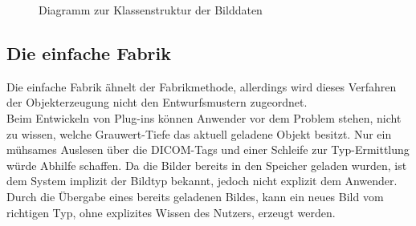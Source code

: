\begin{figure}[htbp]
  \vspace{0.5cm}
  \centering
  \caption{Diagramm zur Klassenstruktur der Bilddaten}
  \label{imagemodel}
  \vspace{0.5cm}
\end{figure}

\FloatBarrier
\subsection{Die einfache Fabrik}

Die einfache Fabrik ähnelt der Fabrikmethode, allerdings wird dieses Verfahren der Objekterzeugung nicht den Entwurfsmustern zugeordnet.\\
Beim Entwickeln von Plug-ins können Anwender vor dem Problem stehen, nicht zu wissen, welche Grauwert-Tiefe das aktuell geladene Objekt besitzt. Nur ein mühsames Auslesen über die DICOM-Tags und einer Schleife zur Typ-Ermittlung würde Abhilfe schaffen. Da die Bilder bereits in den Speicher geladen wurden, ist dem System implizit der Bildtyp bekannt, jedoch nicht explizit dem Anwender. Durch die Übergabe eines bereits geladenen Bildes, kann ein neues Bild vom richtigen Typ, ohne explizites Wissen des Nutzers, erzeugt werden.


